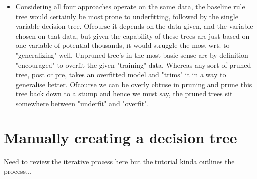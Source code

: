 \documentclass{article}
\begin{document}
\begin{itemize}
	\item Considering all four approaches operate on the same data, the baseline rule tree would certainly be most prone to underfitting, followed by the single variable decision tree. Ofcourse it depends on the data given, and the variable chosen on that data, but given the capability of these trees are just based on one variable of potential thousands, it would struggle the most wrt. to "generalizing" well. Unpruned tree's in the most basic sense are by definition "encouraged" to overfit the given "training" data. Whereas any sort of pruned tree, post or pre, takes an overfitted model and "trims" it in a way to generalise better. Ofcourse we can be overly obtuse in pruning and prune this tree back down to a stump and hence we must say, the pruned trees sit somewhere between "underfit" and "overfit".
\end{itemize}

\section{Manually creating a decision tree}
Need to review the iterative process here but the tutorial kinda outlines the process...
\end{document}
